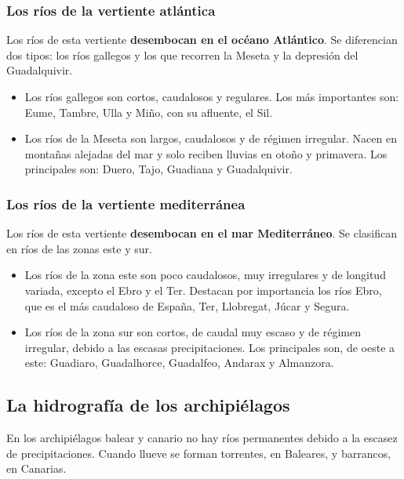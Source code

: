 \subsubsection{Los ríos de la vertiente atlántica}

Los ríos de esta vertiente \textbf{desembocan en el océano Atlántico}. Se diferencian dos tipos: los ríos gallegos y los que recorren la Meseta y la depresión del Guadalquivir.

\begin{itemize}
    \item Los ríos gallegos son cortos, caudalosos y regulares. Los más importantes son: Eume, Tambre, Ulla y Miño, con su afluente, el Sil.
    \item Los ríos de la Meseta son largos, caudalosos y de régimen irregular. Nacen en montañas alejadas del mar y solo reciben lluvias en otoño y primavera. Los principales son: Duero, Tajo, Guadiana y Guadalquivir.
\end{itemize}

\subsubsection{Los ríos de la vertiente mediterránea}

Los ríos de esta vertiente \textbf{desembocan en el mar Mediterráneo}. Se clasifican en ríos de las zonas este y sur.

\begin{itemize}
    \item Los ríos de la zona este son poco caudalosos, muy irregulares y de longitud variada, excepto el Ebro y el Ter. Destacan por importancia los ríos Ebro, que es el más caudaloso de España, Ter, Llobregat, Júcar y Segura.
    \item Los ríos de la zona sur son cortos, de caudal muy escaso y de régimen irregular, debido a las escasas precipitaciones. Los principales son, de oeste a este: Guadiaro, Guadalhorce, Guadalfeo, Andarax y Almanzora.
\end{itemize}

\subsection{La hidrografía de los archipiélagos}

En los archipiélagos balear y canario no hay ríos permanentes debido a la escasez de precipitaciones. Cuando llueve se forman torrentes, en Baleares, y barrancos, en Canarias.